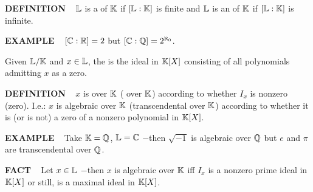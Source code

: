 \vspace{0.1cm}

\begin{x}{\small\bf DEFINITION} \ %
$\mathbb{L}$ is a 
of $\mathbb{K}$ if $[\mathbb{L}:\mathbb{K}]$ is finite and $\mathbb{L}$ is an 
of $\mathbb{K}$ if $[\mathbb{L}:\mathbb{K}]$ is infinite.
\end{x}

\vspace{0.1cm}


\begin{x}{\small\bf EXAMPLE} \ %
$[\mathbb{C}:\mathbb{R}] = 2$ but $[\mathbb{C}:\mathbb{Q}] = 2^{\aleph_0}$.
\end{x}

\vspace{0.1cm}

Given $\mathbb{L}/\mathbb{K}$ and $x \in \mathbb{L}$, the 
is the ideal in $\mathbb{K}[X]$ consisting of all polynomials admitting $x$ as a zero.

\vspace{0.2cm}

\begin{x}{\small\bf DEFINITION} \ %
$x$ is 
over $\mathbb{K}$ 
( over $\mathbb{K}$)
according to whether $I_x$ is nonzero (zero).  
I.e.: $x$ is algebraic over $\mathbb{K}$ (transcendental over $\mathbb{K}$) according to whether it is (or is not) 
a zero of a nonzero polynomial in $\mathbb{K}[X]$.
\end{x}

\vspace{0.1cm}

\begin{x}{\small\bf EXAMPLE} \ %
Take $\mathbb{K} = \mathbb{Q}$, $\mathbb{L} = \mathbb{C}$ $-$then $\sqrt{-1}$ is algebraic over $\mathbb{Q}$ but $e$ and $\pi$ are transcendental over $\mathbb{Q}$.
\end{x}

\vspace{0.1cm}

\begin{x}{\small\bf FACT} \ %
Let $x \in \mathbb{L}$ $-$then $x$ is algebraic over $\mathbb{K}$ iff $I_x$ is a nonzero prime ideal in $\mathbb{K}[X]$ or still, 
is a maximal ideal in $\mathbb{K}[X]$.
\end{x}

